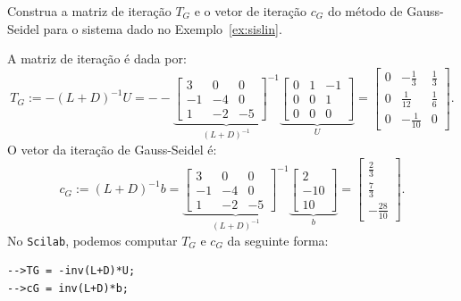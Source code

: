 \begin{ex}
  Construa a matriz de iteração $T_G$ e o vetor de iteração $c_G$ do método de Gauss-Seidel para o sistema dado no Exemplo~\ref{ex:sislin}.
\end{ex}
\begin{sol}
  A matriz de iteração é dada por:
  \begin{equation*}
    T_G := -(L+D)^{-1}U = -
    -\underbrace{\begin{bmatrix}
      3 & 0 & 0\\
      -1 & -4 & 0\\
      1 & -2 & -5
    \end{bmatrix}^{-1}}_{(L + D)^{-1}}
  \underbrace{\begin{bmatrix}
    0 & 1 & -1\\
    0 & 0 & 1\\
    0 & 0 & 0
  \end{bmatrix}}_{U} =
\begin{bmatrix}
  0 & -\frac{1}{3} & \frac{1}{3}\\
  0 & \frac{1}{12} & \frac{1}{6}\\
  0 & -\frac{1}{10} & 0
\end{bmatrix}.
  \end{equation*}
O vetor da iteração de Gauss-Seidel é:
\begin{equation*}
  c_G := (L+D)^{-1}b = 
    \underbrace{\begin{bmatrix}
      3 & 0 & 0\\
      -1 & -4 & 0\\
      1 & -2 & -5
    \end{bmatrix}^{-1}}_{(L + D)^{-1}}
    \underbrace{\begin{bmatrix}
      2\\
      -10\\
      10
    \end{bmatrix}}_{b} = 
    \begin{bmatrix}
      \frac{2}{3}\\
      \frac{7}{3}\\
      -\frac{28}{10}
    \end{bmatrix}.
\end{equation*}
\ifisscilab
No \verb+Scilab+, podemos computar $T_G$ e $c_G$ da seguinte forma:
\begin{verbatim}
-->TG = -inv(L+D)*U;
-->cG = inv(L+D)*b;
\end{verbatim}
\fi
\end{sol}

